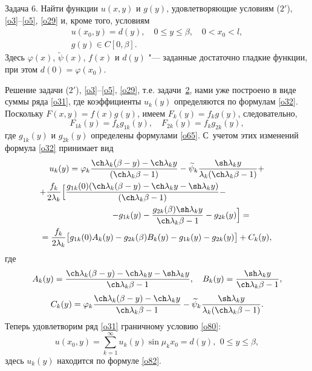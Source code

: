 \smallskip

\hypertarget{sab:task6}{}

{\small\sc Задача 6.} Найти функции $u(x,y)$ и $g(y)$, удовлетворяющие условиям (\hyperlink{sab:(2')}{$2'$}), \eqref{o3}--\eqref{o5}, \eqref{o29} и, кроме того, условиям
\begin{gather}\label{o80}
u(x_0,y)=d(y),\quad 0\leq y\leq \beta,\quad 0<x_0<l,
\\
\label{o81}
g(y)\in C[0,\beta].
\end{gather}
Здесь $\varphi(x)$, $\widetilde{\psi}(x)$, $f(x)$ и $d(y)$ "--- заданные достаточно гладкие функции, при этом $d(0)=\varphi(x_0)$.

\smallskip

Решение задачи (\hyperlink{sab:(2')}{$2'$}), \eqref{o3}--\eqref{o5}, \eqref{o29}, т.е. задачи~\hyperlink{sab:task2}{2}, нами уже построено в виде суммы ряда \eqref{o31}, где коэффициенты $u_k(y)$ определяются по формулам \eqref{o32}. Поскольку $F(x,y)=f(x)g(y)$, имеем $F_k(y)=f_kg(y)$, следовательно,
$$
F_{1k}(y)=f_kg_{1k}(y),\quad F_{2k}(y)=f_kg_{2k}(y),
$$
где $g_{1k}(y)$ и $g_{2k}(y)$ определены формулами \eqref{o65}. 
С~учетом этих изменений формула \eqref{o32} принимает вид
\begin{multline}
u_k(y)=\varphi_k\frac{\ch\lambda_k(\beta-y)-\ch\lambda_ky}{(\ch\lambda_k\beta-1)}- \widetilde{\psi}_k\frac{\sh\lambda_ky}{\lambda_k(\ch\lambda_k\beta-1)}+
\\
+\frac{f_k}{2\lambda_k}
\Bigl[\frac{g_{1k}(0)(\ch\lambda_k(\beta-y)-\ch\lambda_ky-\sh\lambda_ky)}{(\ch\lambda_k\beta-1)}- \hspace{2cm}
\\
\hspace{2cm}
-
 g_{1k}(y)- 
\frac{g_{2k}(\beta)\sh\lambda_ky}{\ch\lambda_k\beta-1}-g_{2k}(y)\Bigr]=
\\\label{o82}
=\frac{f_k}{2\lambda_k}\bigl[g_{1k}(0)A_k(y)-g_{2k}(\beta)B_k(y)-g_{1k}(y)-g_{2k}(y)\bigr]+C_k(y),
\end{multline}
где
$$
A_k(y)=\frac{\ch\lambda_k(\beta-y)-\ch\lambda_ky-\sh\lambda_ky}{\ch\lambda_k\beta-1},
\quad 
B_k(y)=\frac{\sh\lambda_ky}{\ch\lambda_k\beta-1},
$$
$$
C_k(y)=\varphi_k\frac{\ch\lambda_k(\beta-y)-\ch\lambda_ky}{\ch\lambda_k\beta-1}- \widetilde{\psi}_k\frac{\sh\lambda_ky}{\lambda_k(\ch\lambda_k\beta-1)}.
$$
Теперь удовлетворим ряд \eqref{o31} граничному условию \eqref{o80}:
\begin{equation}\label{o83}
u(x_0,y)=\sum\limits_{k=1}^{\infty}u_k(y)\sin\mu_kx_0=d(y),\,\ 0\leq y\leq \beta,
\end{equation}
здесь $u_k(y)$ находится по формуле \eqref{o82}.

